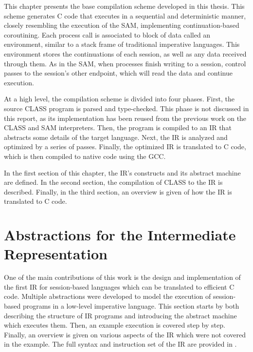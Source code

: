 \label{chap:architecture}

This chapter presents the base compilation scheme developed in this thesis. This scheme generates C code that executes in a sequential and deterministic manner, closely resembling the execution of the \ac{SAM}, implementing continuation-based coroutining. Each process call is associated to block of data called an environment, similar to a stack frame of traditional imperative languages. This environment stores the continuations of each session, as well as any data received through them. As in the \ac{SAM}, when processes finish writing to a session, control passes to the session's other endpoint, which will read the data and continue execution.

At a high level, the compilation scheme is divided into four phases. First, the source \ac{CLASS} program is parsed and type-checked. This phase is not discussed in this report, as its implementation has been reused from the previous work \cite{Rocha:2023, Caires:2024} on the \ac{CLASS} and \ac{SAM} interpreters. Then, the program is compiled to an \acf{IR} that abstracts some details of the target language. Next, the \ac{IR} is analyzed and optimized by a series of passes. Finally, the optimized \ac{IR} is translated to C code, which is then compiled to native code using the \acf{GCC}.

In the first section of this chapter, the \ac{IR}'s constructs and its abstract machine are defined. In the second section, the compilation of \ac{CLASS} to the \ac{IR} is described. Finally, in the third section,
an overview is given of how the \ac{IR} is translated to C code.

\section{Abstractions for the Intermediate Representation} \label{section:IR}

One of the main contributions of this work is the design and implementation of the first \acf{IR} for session-based languages which can be translated to efficient C code. Multiple abstractions were developed to model the execution of session-based programs in a low-level imperative language. This section starts by both describing the structure of \ac{IR} programs and introducing the abstract machine which executes them. Then, an example execution is covered step by step. Finally, an overview is given on various aspects of the \ac{IR} which were not covered in the example. The full syntax and instruction set of the \ac{IR} are provided in .

